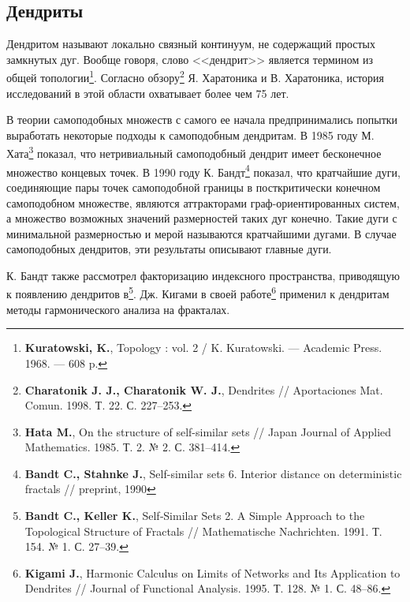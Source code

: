 \documentclass[a5paper,9pt,twoside]{extarticle} %
\begin{document}
\subsection{Дендриты}

Дендритом называют локально связный континуум, не содержащий простых замкнутых дуг.
Вообще говоря, слово <<дендрит>> является термином из общей топологии\footnote{{\bf Kuratowski, K.}, Topology : vol. 2 / K. Kuratowski. --- Academic Press. 1968. --- 608 p.}. Согласно обзору\footnote{{\bf Charatonik J. J., Charatonik W. J.}, Dendrites // Aportaciones Mat. Comun. 1998. Т. 22. С. 227--253.} Я. Харатоника и В. Харатоника, история исследований в этой области охватывает более чем 75 лет.

В теории самоподобных множеств с самого ее начала предпринимались попытки выработать некоторые подходы к самоподобным дендритам.
В 1985 году М. Хата\footnote{{\bf Hata M.}, On the structure of self-similar sets // Japan Journal of Applied Mathematics. 1985. Т. 2. № 2. С. 381--414.
} показал, что нетривиальный самоподобный дендрит имеет бесконечное множество концевых точек.
В 1990 году К. Бандт\footnote{{\bf Bandt C., Stahnke J.}, Self-similar sets 6. Interior distance on deterministic fractals // preprint, 1990} показал, что кратчайшие дуги, соединяющие пары точек самоподобной границы в посткритически конечном самоподобном множестве, являются аттракторами граф-ориентированных систем, а множество возможных значений размерностей таких дуг конечно.
Такие дуги с минимальной размерностью и мерой называются кратчайшими дугами.
В случае самоподобных дендритов, эти результаты описывают главные дуги.

К. Бандт также рассмотрел факторизацию индексного пространства, приводящую к появлению дендритов в\footnote{{\bf Bandt C., Keller K.}, Self‐Similar Sets 2. A Simple Approach to the Topological Structure of Fractals // Mathematische Nachrichten. 1991. Т. 154. № 1. С. 27--39.}.
Дж. Кигами в своей работе\footnote{{\bf Kigami J.}, Harmonic Calculus on Limits of Networks and Its Application to Dendrites // Journal of Functional Analysis. 1995. Т. 128. № 1. С. 48--86.} применил к дендритам методы гармонического анализа на фракталах. 
\end{document}
